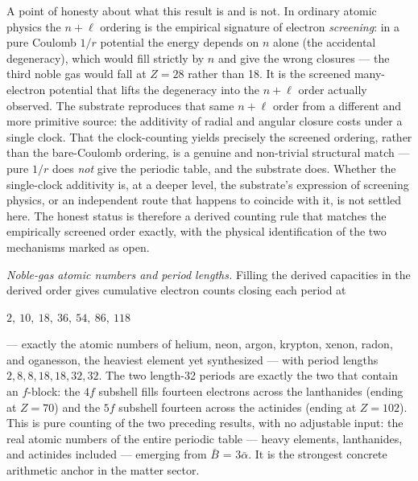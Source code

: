 \documentclass[11pt,oneside]{report}
\theoremstyle{definition}
\theoremstyle{remark}
\begin{document}
A point of honesty about what this result is and is not. In ordinary atomic
physics the \ensuremath{n+\ell} ordering is the empirical signature of electron
\emph{screening}: in a pure Coulomb \ensuremath{1/r} potential the energy depends on \ensuremath{n}
alone (the accidental degeneracy), which would fill strictly by \ensuremath{n} and give the
wrong closures --- the third noble gas would fall at \ensuremath{Z=28} rather than 18. It is
the screened many-electron potential that lifts the degeneracy into the \ensuremath{n+\ell}
order actually observed. The substrate reproduces that same \ensuremath{n+\ell} order from a
different and more primitive source: the additivity of radial and angular closure
costs under a single clock. That the clock-counting yields precisely the screened
ordering, rather than the bare-Coulomb ordering, is a genuine and non-trivial
structural match --- pure \ensuremath{1/r} does \emph{not} give the periodic table, and the
substrate does. Whether the single-clock additivity is, at a deeper level, the
substrate's expression of screening physics, or an independent route that happens
to coincide with it, is not settled here. The honest status is therefore a
derived counting rule that matches the empirically screened order exactly, with
the physical identification of the two mechanisms marked as open.

\emph{Noble-gas atomic numbers and period lengths.} Filling the derived
capacities in the derived order gives cumulative electron counts closing
each period at
\begin{center}
\ensuremath{2,\ 10,\ 18,\ 36,\ 54,\ 86,\ 118}
\end{center}
--- exactly the atomic numbers of helium, neon, argon, krypton, xenon, radon,
and oganesson, the heaviest element yet synthesized --- with period lengths
\ensuremath{2, 8, 8, 18, 18, 32, 32}. The two length-32 periods are exactly the two that
contain an \ensuremath{f}-block: the \ensuremath{4f} subshell fills fourteen electrons across the
lanthanides (ending at \ensuremath{Z = 70}) and the \ensuremath{5f} subshell fourteen across the
actinides (ending at \ensuremath{Z = 102}). This is pure counting of the two preceding
results, with no adjustable input: the real atomic numbers of the entire
periodic table --- heavy elements, lanthanides, and actinides included ---
emerging from \ensuremath{\bar{B}} = \ensuremath{3\bar{\alpha}}. It is the strongest concrete arithmetic
anchor in the matter sector.
\end{document}
